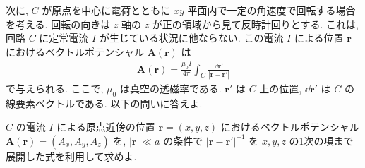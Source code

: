 \documentclass[../../ou-physics-exam.tex]{subfiles}
\begin{document}
次に, $ C $ が原点を中心に電荷とともに $ xy $ 平面内で一定の角速度で回転する場合を考える. 
回転の向きは $ z $ 軸の $ z $ が正の領域から見て反時計回りとする. 
これは, 回路 $ C $ に定常電流 $ I $ が生じている状況に他ならない. 
この電流 $ I $ による位置 $ \bm{r} $ におけるベクトルポテンシャル $ \bm{A} (\bm{r}) $ は
\begin{align*}
    \bm{A} (\bm{r}) = \frac{\mu_0 I}{4 \pi } \int_C \frac{\dd{\bm{r'}}}{|\bm{r} - \bm{r'} |}
\end{align*}
で与えられる. 
ここで, $ \mu_0 $ は真空の透磁率である. 
$ \bm{r'} $ は $ C $ 上の位置, $ \dd{\bm{r'}} $ は $ C $ の線要素ベクトルである. 
以下の問いに答えよ.

$ C $ の電流 $ I $ による原点近傍の位置 $ \bm{r} = (x, y, z) $ におけるベクトルポテンシャル $ \bm{A} (\bm{r}) = (A_x, A_y, A_z) $ を, $ | \bm{r} | \ll a $ の条件で $ | \bm{r} - \bm{r'} |^{-1} $ を $ x, y, z $ の1次の項まで展開した式を利用して求めよ.
\end{document}
